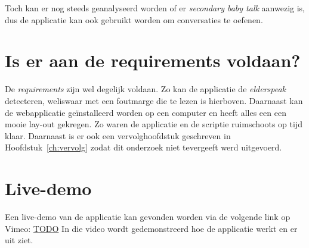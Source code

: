 Toch kan er nog steeds geanalyseerd worden of er \textit{secondary baby talk} aanwezig is, dus de applicatie kan ook gebruikt worden om conversaties te oefenen.

\section{Is er aan de requirements voldaan?}
De \textit{requirements} zijn wel degelijk voldaan. Zo kan de applicatie de \textit{elderspeak} detecteren, weliswaar met een foutmarge die te lezen is hierboven.
Daarnaast kan de webapplicatie geïnstalleerd worden op een computer en heeft alles een een mooie lay-out gekregen.
Zo waren de applicatie en de scriptie ruimschoots op tijd klaar. Daarnaast is er ook een vervolghoofdstuk geschreven in Hoofdstuk~\ref{ch:vervolg} zodat dit onderzoek niet tevergeeft werd uitgevoerd.

\section{Live-demo}
Een live-demo van de applicatie kan gevonden worden via de volgende link op Vimeo: \url{TODO}
In die video wordt gedemonstreerd hoe de applicatie werkt en er uit ziet.
